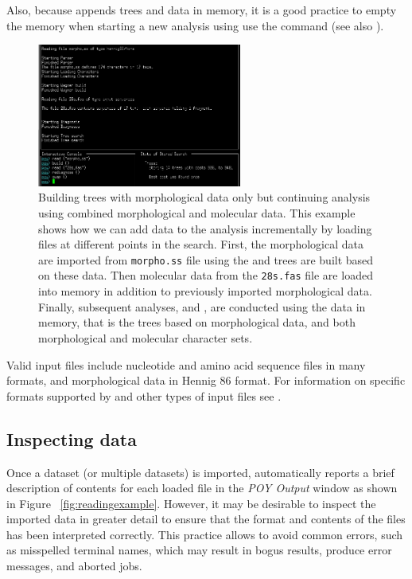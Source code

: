 Also, because \poy appends trees and data in memory, it is a good practice to empty the memory when starting a new analysis using use the  command (see also ).

\begin{figure}[]
    \begin{center}
        \includegraphics[width=0.6\textwidth]{figures/reading_example2.jpg}
    \end{center}
    \caption{Building trees with morphological data only but continuing analysis using combined morphological and molecular data. This example shows how we can add data to the analysis incrementally by loading files at different points in the search. First, the morphological data are imported from \texttt{morpho.ss} file using  the and trees are built based on these data. Then molecular data from the \texttt{28s.fas} file are loaded into memory in addition to previously imported morphological data. Finally, subsequent analyses,  and , are conducted using the data in memory, that is the trees based on morphological data, and both morphological and molecular character sets.}
    \label{fig:reading_example2}
\end{figure}

Valid input files include nucleotide and amino acid sequence files in many formats,
and morphological data in Hennig 86 format. For information on specific formats supported by \poy and other types of input files see .

\subsection{Inspecting data}

Once a dataset (or multiple datasets) is imported, \poy automatically reports a brief description of contents for each loaded file in the \emph{POY Output} window as shown in Figure ~\ref{fig:readingexample}. However, it may be desirable to inspect the imported data in greater detail to ensure that the format and contents of the files has been interpreted correctly. This practice allows to avoid common errors, such as misspelled terminal names, which may result in bogus results, produce error messages, and aborted jobs.


